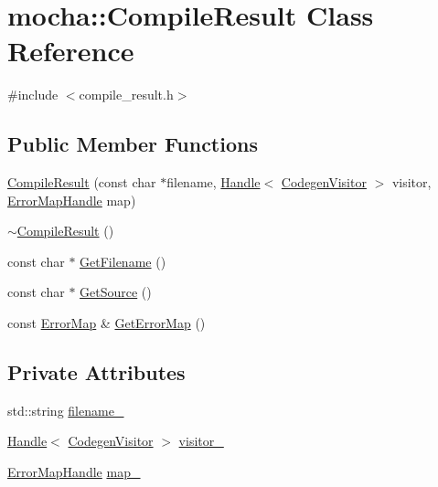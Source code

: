 \hypertarget{classmocha_1_1_compile_result}{
\section{mocha::CompileResult Class Reference}
\label{classmocha_1_1_compile_result}
}


{\ttfamily \#include $<$compile\_\-result.h$>$}

\subsection*{Public Member Functions}
\begin{DoxyCompactItemize}
\item 
\hyperlink{classmocha_1_1_compile_result_a834530898eed167227ccc2d0cd11d849}{CompileResult} (const char $\ast$filename, \hyperlink{classmocha_1_1_handle}{Handle}$<$ \hyperlink{classmocha_1_1_codegen_visitor}{CodegenVisitor} $>$ visitor, \hyperlink{classmocha_1_1_handle}{ErrorMapHandle} map)
\item 
\hyperlink{classmocha_1_1_compile_result_ac9c89c99fd21f1c19e8ddfc969f5af45}{$\sim$CompileResult} ()
\item 
const char $\ast$ \hyperlink{classmocha_1_1_compile_result_a16ec97d8000b653f3d835785ea19ecca}{GetFilename} ()
\item 
const char $\ast$ \hyperlink{classmocha_1_1_compile_result_af8cf87f14967bf32106f181a1539b1b5}{GetSource} ()
\item 
const \hyperlink{classmocha_1_1_hash_map}{ErrorMap} \& \hyperlink{classmocha_1_1_compile_result_ace1f71a7012e336e3f22793f16052501}{GetErrorMap} ()
\end{DoxyCompactItemize}
\subsection*{Private Attributes}
\begin{DoxyCompactItemize}
\item 
std::string \hyperlink{classmocha_1_1_compile_result_a69d7f443ef3b2117ea3dfb1029bbd4e8}{filename\_\-}
\item 
\hyperlink{classmocha_1_1_handle}{Handle}$<$ \hyperlink{classmocha_1_1_codegen_visitor}{CodegenVisitor} $>$ \hyperlink{classmocha_1_1_compile_result_a61362b2f729b2d1b1fb7aa79c4fde52f}{visitor\_\-}
\item 
\hyperlink{classmocha_1_1_handle}{ErrorMapHandle} \hyperlink{classmocha_1_1_compile_result_ab04d46e6dd228a05c487abd7c6e23c72}{map\_\-}
\end{DoxyCompactItemize}


